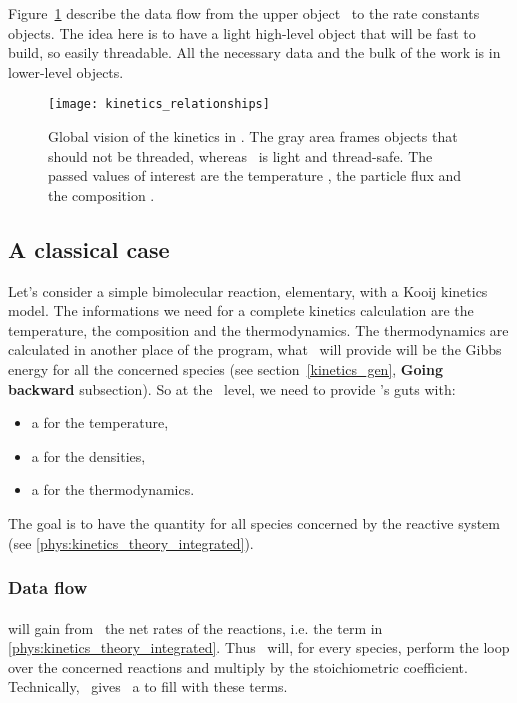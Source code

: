 Figure~\ref{kinpf} describe the data flow from the upper
object \KineticsEvaluator\ to the rate constants objects.
The idea here is to have a light high-level object that will
be fast to build, so easily threadable. All the necessary data
and the bulk of the work is in lower-level objects.
%
\begin{figure}
\centering
\texttt{[image: kinetics\_relationships]}
\caption{\label{kinpf}Global vision of the kinetics in \Antioch.
The gray area frames objects that should not be threaded, whereas
\KineticsEvaluator\ is light and thread-safe. The passed values of
interest are the temperature , the
particle flux  and
the composition .}
\end{figure}
%
\subsection{A classical case}

Let's consider a simple bimolecular reaction, elementary,
with a Kooij kinetics model. The informations we need for
a complete kinetics calculation are the temperature, the
composition and the thermodynamics. The thermodynamics are
calculated in another place of the program, what \Antioch\
will provide will be the Gibbs energy for all the concerned
species (see section~\ref{kinetics_gen}, \textbf{Going backward}
subsection). So at the \KineticsEvaluator\ level, we need
to provide \Antioch's guts with:
\begin{itemize}
\item a  for the temperature,
\item a  for
                the densities,
\item a  for
                the thermodynamics.
\end{itemize}

The goal is to have the quantity  for all species  concerned by the 
reactive system (see \ref{phys:kinetics_theory_integrated}).

\subsubsection{Data flow}

\paragraph{\KineticsEvaluator}
will gain from \ReactionSet\ the net rates of
the reactions,  i.e. the term \rate[r] in \ref{phys:kinetics_theory_integrated}.
Thus \KineticsEvaluator\ will, for every species, perform the loop
over the concerned reactions and multiply by the stoichiometric coefficient.
Technically, \KineticsEvaluator\ gives \ReactionSet\ a \prog{VectorCoeffType}
to fill with these terms.

